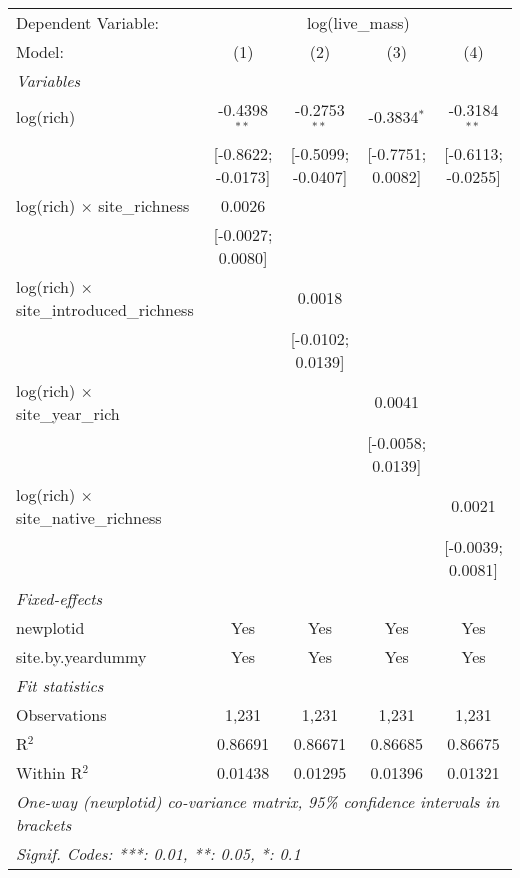 \begin{tabular}{lcccc}
\tabularnewline\midrule\midrule
Dependent Variable:&\multicolumn{4}{c}{log(live\_mass)}\\
Model:&(1) & (2) & (3) & (4)\\
\midrule \emph{Variables}&   &   &   &  \\
log(rich)&-0.4398$^{**}$ & -0.2753$^{**}$ & -0.3834$^{*}$ & -0.3184$^{**}$\\
  &[-0.8622; -0.0173] & [-0.5099; -0.0407] & [-0.7751; 0.0082] & [-0.6113; -0.0255]\\
log(rich) $\times $ site\_richness&0.0026 &    &    &   \\
  &[-0.0027; 0.0080] &    &    &   \\
log(rich) $\times $ site\_introduced\_richness&   & 0.0018 &    &   \\
  &   & [-0.0102; 0.0139] &    &   \\
log(rich) $\times $ site\_year\_rich&   &    & 0.0041 &   \\
  &   &    & [-0.0058; 0.0139] &   \\
log(rich) $\times $ site\_native\_richness&   &    &    & 0.0021\\
  &   &    &    & [-0.0039; 0.0081]\\
\midrule \emph{Fixed-effects}&   &   &   &  \\
newplotid & Yes & Yes & Yes & Yes\\
site.by.yeardummy & Yes & Yes & Yes & Yes\\
\midrule \emph{Fit statistics}&  & & & \\
Observations & 1,231&1,231&1,231&1,231\\
R$^2$ & 0.86691&0.86671&0.86685&0.86675\\
Within R$^2$ & 0.01438&0.01295&0.01396&0.01321\\
\midrule\midrule\multicolumn{5}{l}{\emph{One-way (newplotid) co-variance matrix, 95\% confidence intervals in brackets}}\\
\multicolumn{5}{l}{\emph{Signif. Codes: ***: 0.01, **: 0.05, *: 0.1}}\\
\end{tabular}


